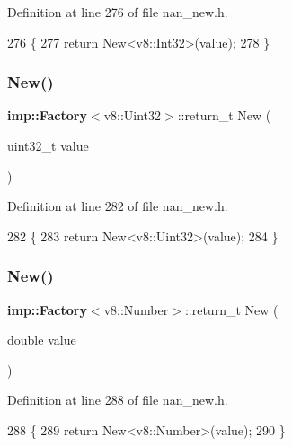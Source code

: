 Definition at line 276 of file nan\+\_\+new.\+h.


\begin{DoxyCode}
276                    \{
277   \textcolor{keywordflow}{return} New<v8::Int32>(value);
278 \}
\end{DoxyCode}
\mbox{\label{nan__new_8h_a03e12339c97c8c9fd6c0330e34df2d6f}} 
\subsubsection{New()\hspace{0.1cm}{\footnotesize\ttfamily [13/22]}}
{\footnotesize\ttfamily \textbf{ imp\+::\+Factory}$<$v8\+::\+Uint32$>$\+::return\+\_\+t New (\begin{DoxyParamCaption}\item[{uint32\+\_\+t}]{value }\end{DoxyParamCaption})}



Definition at line 282 of file nan\+\_\+new.\+h.


\begin{DoxyCode}
282                     \{
283   \textcolor{keywordflow}{return} New<v8::Uint32>(value);
284 \}
\end{DoxyCode}
\mbox{\label{nan__new_8h_a8b001a2913f37eec3e9d2b739253283d}} 
\subsubsection{New()\hspace{0.1cm}{\footnotesize\ttfamily [14/22]}}
{\footnotesize\ttfamily \textbf{ imp\+::\+Factory}$<$v8\+::\+Number$>$\+::return\+\_\+t New (\begin{DoxyParamCaption}\item[{double}]{value }\end{DoxyParamCaption})}



Definition at line 288 of file nan\+\_\+new.\+h.


\begin{DoxyCode}
288                   \{
289   \textcolor{keywordflow}{return} New<v8::Number>(value);
290 \}
\end{DoxyCode}
\mbox{\label{nan__new_8h_a2d15fa0348b6096436cdf97c9dab441a}} 
